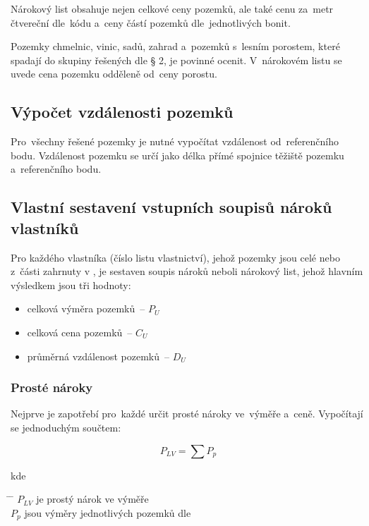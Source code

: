 Nárokový list obsahuje nejen celkové ceny pozemků, ale také cenu
za~metr čtvereční dle~kódu  a~ceny částí pozemků
dle~jednotlivých bonit.

Pozemky chmelnic, vinic, sadů, zahrad a~pozemků s~lesním porostem, které
spadají do skupiny řešených dle § 2, je povinné ocenit. V~nárokovém listu
se uvede cena pozemku odděleně od~ceny porostu.

\subsection{Výpočet vzdálenosti pozemků}
\label{vypocet_vzdalnosti_pozemku}

Pro~všechny řešené pozemky je nutné vypočítat vzdálenost
od~referenčního bodu. Vzdálenost pozemku se určí jako délka přímé
spojnice těžiště pozemku a~referenčního bodu.

\subsection{Vlastní sestavení vstupních soupisů nároků vlastníků}
\label{vlastni_naroky}

Pro každého vlastníka (číslo listu vlastnictví), jehož pozemky jsou celé
nebo z~části zahrnuty v , je sestaven soupis nároků neboli nárokový
list, jehož hlavním výsledkem jsou tři hodnoty:
\vspace{-\topsep}
	\begin{itemize}[leftmargin=1.5cm, noitemsep]
		\item celková výměra pozemků~– $P_{U}$
		\item celková cena pozemků~– $C_{U}$
		\item průměrná vzdálenost pozemků~– $D_{U}$
	\end{itemize}

\subsubsection{Prosté nároky}
\label{proste_naroky}

Nejprve je zapotřebí pro~každé  určit prosté nároky ve~výměře
a~ceně. Vypočítají se jednoduchým součtem:

\begin{equation} P_{LV} = \sum\nolimits P_{p}
\end{equation}

kde
\begin{tabbing} \hspace{2em} \= \hspace{5em} \= \kill \> $P_{LV}$ \>
je prostý nárok ve výměře \\ \> $P_{p}$ \> jsou výměry jednotlivých
pozemků dle 
\end{tabbing}

